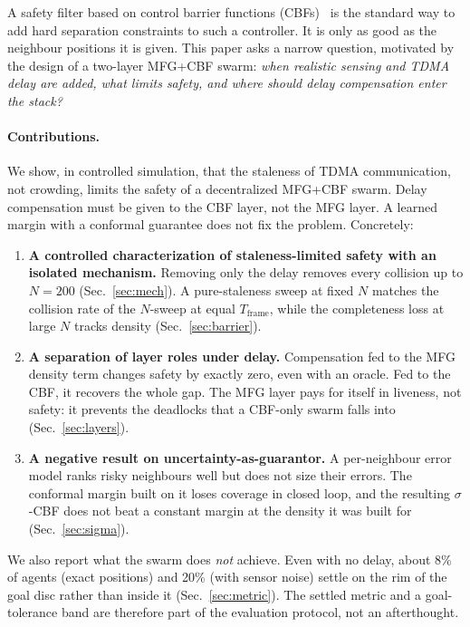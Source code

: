 \documentclass{article}
\newcommand{\Tf}{T_{\mathrm{frame}}}
\begin{document}
A safety filter based on control barrier functions (CBFs)~\cite{ames2017cbf,wang2017safety} is
the standard way to add hard separation constraints to such a controller. It is only as good as
the neighbour positions it is given. This paper asks a narrow question, motivated by the design of
a two-layer MFG+CBF swarm: \emph{when realistic sensing and TDMA delay are added, what limits
safety, and where should delay compensation enter the stack?}

\paragraph{Contributions.}
We show, in controlled simulation, that the staleness of TDMA communication, not crowding, limits
the safety of a decentralized MFG+CBF swarm. Delay compensation must be given to the CBF layer,
not the MFG layer. A learned margin with a conformal guarantee does not fix the problem.
Concretely:
\begin{enumerate}
\item \textbf{A controlled characterization of staleness-limited safety with an isolated mechanism.}
  Removing only the delay removes every collision up to $N{=}200$ (Sec.~\ref{sec:mech}). A
  pure-staleness sweep at fixed $N$ matches the collision rate of the $N$-sweep at equal
  $\Tf$, while the completeness loss at large $N$ tracks density (Sec.~\ref{sec:barrier}).
\item \textbf{A separation of layer roles under delay.} Compensation fed to the MFG density
  term changes safety by exactly zero, even with an oracle. Fed to the CBF, it recovers the whole
  gap. The MFG layer pays for itself in liveness, not safety: it prevents the deadlocks that a
  CBF-only swarm falls into (Sec.~\ref{sec:layers}).
\item \textbf{A negative result on uncertainty-as-guarantor.} A per-neighbour error model ranks
  risky neighbours well but does not size their errors. The conformal margin built on it loses
  coverage in closed loop, and the resulting $\sigma$-CBF does not beat a constant margin at the
  density it was built for (Sec.~\ref{sec:sigma}).
\end{enumerate}
We also report what the swarm does \emph{not} achieve. Even with no delay, about 8\% of agents
(exact positions) and 20\% (with sensor noise) settle on the rim of the goal disc rather than
inside it (Sec.~\ref{sec:metric}). The settled metric and a goal-tolerance band are therefore part
of the evaluation protocol, not an afterthought.
\end{document}
